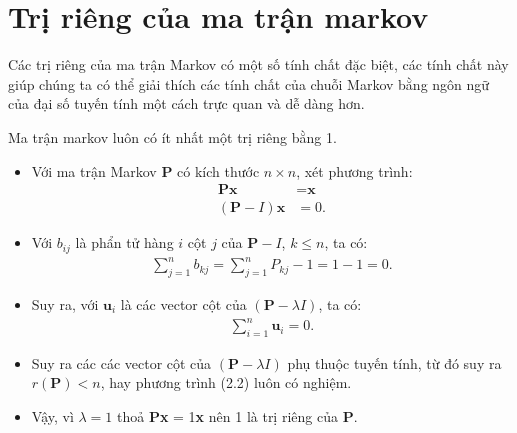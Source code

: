 \section{Trị riêng của ma trận markov}


Các trị riêng của ma trận Markov có một số tính chất đặc biệt, các tính chất này giúp chúng ta có thể giải thích các tính chất của chuỗi Markov bằng ngôn ngữ của đại số tuyến tính một cách trực quan và dễ dàng hơn.

\begin{theovn}
Ma trận markov luôn có ít nhất một trị riêng bằng 1.
\end{theovn}
\begin{proofvn} \vphantom{text}
\begin{itemize}
    \item Với ma trận Markov $\mathbf{P}$ có kích thước $n \times n$, xét phương trình:
    \begin{align}
        \mathbf{P}\textbf{x} &= \textbf{x} \\
        (\mathbf{P} - I)\textbf{x} &= 0.
    \end{align}
   
    \item Với $b_{ij}$ là phẩn tử hàng $i$ cột $j$ của $\mathbf{P} - I$, $k \leq n$, ta có:
    \begin{align}
        \sum_{j = 1}^{n}b_{kj} =  \sum_{j = 1}^{n}P_{kj} - 1 = 1 - 1 = 0.
    \end{align}

    \item Suy ra, với $\textbf{u}_i$ là các vector cột của $(\mathbf{P}-\lambda I)$, ta có:
    \begin{align}
        \sum_{i=1}^{n} \textbf{u}_i = 0.
    \end{align}

    \item Suy ra các các vector cột của $(\mathbf{P}-\lambda I)$ phụ thuộc tuyến tính, từ đó suy ra $r(\mathbf{P}) < n$, hay phương trình (2.2) luôn có nghiệm. 

    \item Vậy, vì $\lambda = 1$ thoả $\mathbf{P}$\textbf{x} = 1\textbf{x} nên 1 là trị riêng của $\mathbf{P}$.
\end{itemize}
\end{proofvn}

